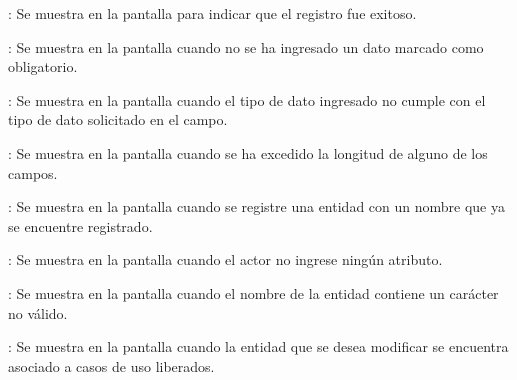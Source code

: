 \begin{Citemize}
	\item {}: Se muestra en la pantalla  para indicar que el registro fue exitoso.
	\item {}: Se muestra en la pantalla  cuando no se ha ingresado un dato marcado como obligatorio.
	\item {}: Se muestra en la pantalla  cuando el tipo de dato ingresado no cumple con el tipo de dato solicitado en el campo.
	\item {}: Se muestra en la pantalla  cuando se ha excedido la longitud de alguno de los campos.
	\item {}: Se muestra en la pantalla  cuando se registre una entidad con un nombre que ya se encuentre registrado.
	\item {}: Se muestra en la pantalla  cuando el actor no ingrese ningún atributo.
	\item {}: Se muestra en la pantalla  cuando el nombre de la entidad contiene un carácter no válido.
	\item {}: Se muestra en la pantalla  cuando la entidad que se desea modificar se encuentra asociado a casos de uso liberados.
\end{Citemize}
